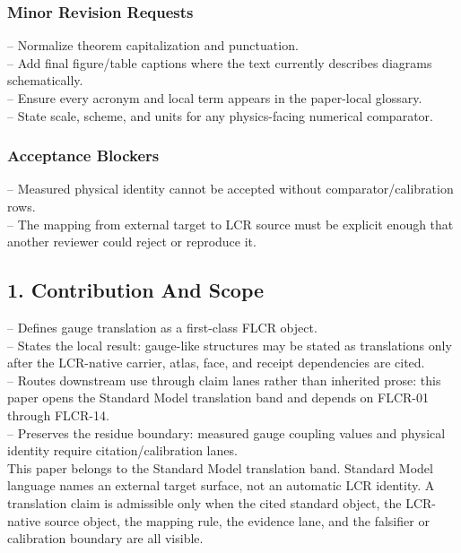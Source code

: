 \documentclass[11pt]{article}
\begin{document}
\subsubsection*{Minor Revision Requests}

\noindent{}-- Normalize theorem capitalization and punctuation.\\
\noindent{}-- Add final figure/table captions where the text currently describes diagrams schematically.\\
\noindent{}-- Ensure every acronym and local term appears in the paper-local glossary.\\
\noindent{}-- State scale, scheme, and units for any physics-facing numerical comparator.\\

\subsubsection*{Acceptance Blockers}

\noindent{}-- Measured physical identity cannot be accepted without comparator/calibration rows.\\
\noindent{}-- The mapping from external target to LCR source must be explicit enough that another reviewer could reject or reproduce it.\\


\subsection*{1. Contribution And Scope}

\noindent{}-- Defines gauge translation as a first-class FLCR object.\\
\noindent{}-- States the local result: gauge-like structures may be stated as translations only after the LCR-native carrier, atlas, face, and receipt dependencies are cited.\\
\noindent{}-- Routes downstream use through claim lanes rather than inherited prose: this paper opens the Standard Model translation band and depends on FLCR-01 through FLCR-14.\\
\noindent{}-- Preserves the residue boundary: measured gauge coupling values and physical identity require citation/calibration lanes.\\

This paper belongs to the Standard Model translation band. Standard Model language names an external target surface, not an automatic LCR identity. A translation claim is admissible only when the cited standard object, the LCR-native source object, the mapping rule, the evidence lane, and the falsifier or calibration boundary are all visible.
\end{document}
